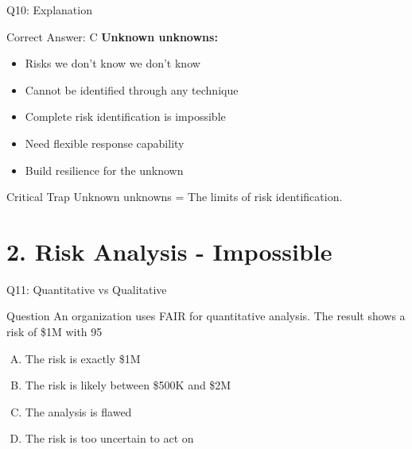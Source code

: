 \documentclass{beamer}
\begin{document}
		\begin{frame}{Q10: Explanation}
			\begin{block}{Correct Answer: C}
				\textbf{Unknown unknowns:}
				\begin{itemize}
					\item Risks we don't know we don't know
					\item Cannot be identified through any technique
					\item Complete risk identification is impossible
					\item Need flexible response capability
					\item Build resilience for the unknown
				\end{itemize}
			\end{block}
			\begin{alertblock}{Critical Trap}
				Unknown unknowns = The limits of risk identification.
			\end{alertblock}
		\end{frame}
		
		
		\section{2. Risk Analysis - Impossible}
		
		\begin{frame}{Q11: Quantitative vs Qualitative}
			\begin{block}{Question}
				An organization uses FAIR for quantitative analysis. The result shows a risk of \$1M with 95%
			\end{block}
			\begin{enumerate}[(A)]
				\item The risk is exactly \$1M
				\item The risk is likely between \$500K and \$2M
				\item The analysis is flawed
				\item The risk is too uncertain to act on
			\end{enumerate}
		\end{frame}
		
\end{document}
